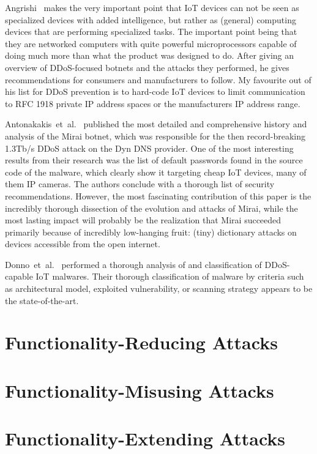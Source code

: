 \documentclass[11pt,a4paper]{article}
\begin{document}
	Angrishi~\cite{Angrishi:2017:TitiiiviIb} %
	makes the very important point that IoT devices can not be seen as specialized devices with added intelligence, but rather as (general) computing devices that are performing specialized tasks.
	The important point being that they are networked computers with quite powerful microprocessors capable of doing much more than what the product was designed to do.
	After giving an overview of DDoS-focused botnets and the attacks they performed, he gives recommendations for consumers and manufacturers to follow. My favourite out of his list for DDoS prevention is to hard-code IoT devices to limit communication to RFC 1918 private IP address spaces or the manufacturers IP address range.

	Antonakakis~et~al.~\cite{Antonakakis:2017:UMB} %
	published the most detailed and comprehensive history and analysis of the Mirai botnet, which was responsible for the then record-breaking 1.3Tb/s DDoS attack on the Dyn DNS provider.
	One of the most interesting results from their research was the list of default passwords found in the source code of the malware, which clearly show it targeting cheap IoT devices, many of them IP cameras.
	The authors conclude with a thorough list of security recommendations.
	However, the most fascinating contribution of this paper is the incredibly thorough dissection of the evolution and attacks of Mirai, while the most lasting impact will probably be the realization that Mirai succeeded primarily because of incredibly low-hanging fruit: (tiny) dictionary attacks on devices accessible from the open internet.

	Donno~et~al.~\cite{Donno:2017:ADIM} %
	performed a thorough analysis of and classification of DDoS-capable IoT malwares.
	Their thorough classification of malware by criteria such as architectural model, exploited vulnerability, or scanning strategy appears to be the state-of-the-art.

	\section{Functionality-Reducing Attacks}%
	\label{sec:functionality_reducing_attacks}


	\section{Functionality-Misusing Attacks}%
	\label{sec:functionality_misusing_attacks}

	\section{Functionality-Extending Attacks}%
	\label{sec:functionality_extending_attacks}



	
	
\end{document}
